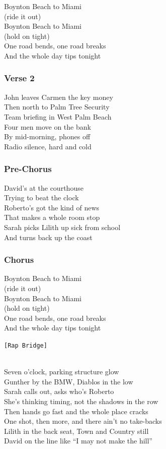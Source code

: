 \documentclass[]{article}
\begin{document}
Boynton Beach to Miami\\
(ride it out)\\
Boynton Beach to Miami\\
(hold on tight)\\
One road bends, one road breaks\\
And the whole day tips tonight

\subsubsection{Verse 2}\label{verse-2-9}

John leaves Carmen the key money\\
Then north to Palm Tree Security\\
Team briefing in West Palm Beach\\
Four men move on the bank\\
By mid-morning, phones off\\
Radio silence, hard and cold

\subsubsection{Pre-Chorus}\label{pre-chorus-18}

David's at the courthouse\\
Trying to beat the clock\\
Roberto's got the kind of news\\
That makes a whole room stop\\
Sarah picks Lilith up sick from school\\
And turns back up the coast

\subsubsection{Chorus}\label{chorus-32}

Boynton Beach to Miami\\
(ride it out)\\
Boynton Beach to Miami\\
(hold on tight)\\
One road bends, one road breaks\\
And the whole day tips tonight

\texttt{{[}Rap\ Bridge{]}}\strut \\
Seven o'clock, parking structure glow\\
Gunther by the BMW, Diablos in the low\\
Sarah calls out, asks who's Roberto\\
She's thinking timing, not the shadows in the row\\
Then hands go fast and the whole place cracks\\
One shot, then more, and there ain't no take-backs\\
Lilith in the back seat, Town and Country still\\
David on the line like ``I may not make the hill''
\end{document}
